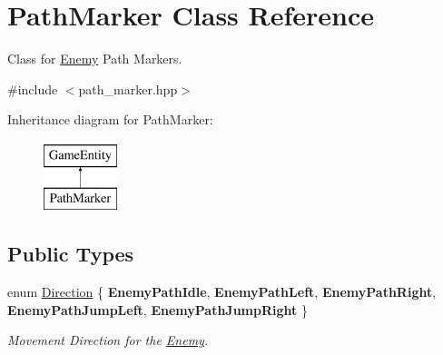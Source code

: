 \hypertarget{class_path_marker}{}\section{Path\+Marker Class Reference}
\label{class_path_marker}


Class for \mbox{\hyperlink{class_enemy}{Enemy}} Path Markers.  




{\ttfamily \#include $<$path\+\_\+marker.\+hpp$>$}

Inheritance diagram for Path\+Marker\+:\begin{figure}[H]
\begin{center}
\leavevmode
\includegraphics[height=2.000000cm]{class_path_marker}
\end{center}
\end{figure}
\subsection*{Public Types}
\begin{DoxyCompactItemize}
\item 
\mbox{\label{class_path_marker_a5cc5188373e0b67016a99d3ded49f301}} 
enum \mbox{\hyperlink{class_path_marker_a5cc5188373e0b67016a99d3ded49f301}{Direction}} \{ \newline
{\bfseries Enemy\+Path\+Idle}, 
{\bfseries Enemy\+Path\+Left}, 
{\bfseries Enemy\+Path\+Right}, 
{\bfseries Enemy\+Path\+Jump\+Left}, 
\newline
{\bfseries Enemy\+Path\+Jump\+Right}
 \}
\begin{DoxyCompactList}\small\item\em Movement Direction for the \mbox{\hyperlink{class_enemy}{Enemy}}. \end{DoxyCompactList}\end{DoxyCompactItemize}
